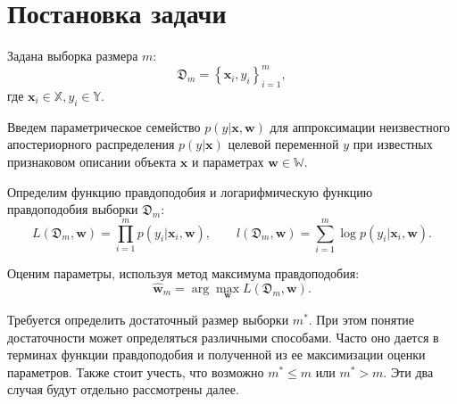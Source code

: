 \section{Постановка задачи}\label{sec1}

Задана выборка размера $m$:
\[ \mathfrak{D}_m = \left\{ \mathbf{x}_i, y_i \right\}_{i = 1}^{m}, \]
где $\mathbf{x}_i \in \mathbb{X}, y_i \in \mathbb{Y}$.

Введем параметрическое семейство $p(y | \mathbf{x}, \mathbf{w})$ для аппроксимации неизвестного апостериорного распределения $p(y | \mathbf{x})$ целевой переменной $y$ при известных признаковом описании объекта $\mathbf{x}$ и параметрах $\mathbf{w} \in \mathbb{W}$. 

Определим функцию правдоподобия и логарифмическую функцию правдоподобия выборки $\mathfrak{D}_m$:
\[ L(\mathfrak{D}_m, \mathbf{w}) = \prod_{i=1}^{m} p(y_i | \mathbf{x}_i, \mathbf{w}), \qquad l(\mathfrak{D}_m, \mathbf{w}) = \sum\limits_{i=1}^{m} \log p(y_i | \mathbf{x}_i, \mathbf{w}). \]

Оценим параметры, используя метод максимума правдоподобия:
\[ \hat{\mathbf{w}}_{m} = \arg\max_{\mathbf{w}} L(\mathfrak{D}_m, \mathbf{w}). \]

Требуется определить достаточный размер выборки $m^*$. При этом понятие достаточности может определяться различными способами. Часто оно дается в терминах функции правдоподобия и полученной из ее максимизации оценки параметров. Также стоит учесть, что возможно $m^* \leqslant m$ или $m^* > m$. Эти два случая будут отдельно рассмотрены далее.